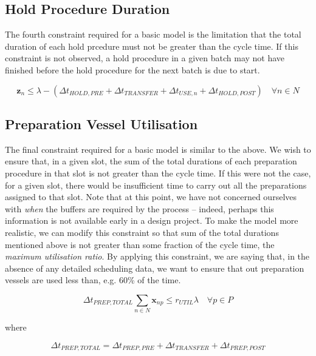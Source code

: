 \subsection{Hold Procedure Duration}\label{SS.constr4}

The fourth constraint required for a basic model is the limitation that the
total duration of each hold prcedure must not be greater than the cycle time.
If this constraint is not observed, a hold procedure in a given batch may not
have finished before the hold procedure for the next batch is due to start.

\begin{equation}
    \boldsymbol{z}_{n} \le \lambda - \left( \Delta t_{HOLD,PRE} +
    \Delta t_{TRANSFER} + \Delta t_{USE,n} + \Delta t_{HOLD,POST} \right)
    \quad \forall n \in N
\end{equation}

\subsection{Preparation Vessel Utilisation}\label{SS.constr5}

The final constraint required for a basic model is similar to the above.
We wish to ensure that, in a given slot, the sum of the total durations of each
preparation procedure in that slot is not greater than the cycle time.
If this were not the case, for a given slot, there would be insufficient
time to carry out all the preparations assigned to that slot.
Note that at this point, we have not concerned ourselves with \emph{when}
the buffers are required by the process -- indeed, perhaps this information is
not available early in a design project.
To make the model more realistic, we can modify this constraint so that sum of
the total durations mentioned above is not greater than some fraction of the
cycle time, the \emph{maximum utilisation ratio}.
By applying this constraint, we are saying that, in the absence of any detailed
scheduling data, we want to ensure that out preparation vessels
are used less than, e.g. 60\% of the time.

\begin{equation}
    \Delta t_{PREP,TOTAL} \sum_{n \in N} \boldsymbol{x}_{np} \le r_{UTIL} 
    \lambda \quad \forall p \in P
\end{equation}

where

\begin{equation}
    \Delta t_{PREP,TOTAL} = \Delta t_{PREP,PRE} + \Delta t_{TRANSFER} +
    \Delta t_{PREP,POST}  
\end{equation}

